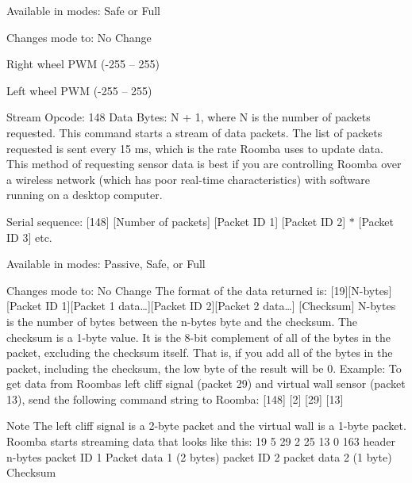 \begin{Desc}
\begin{description}
\begin{DoxyItemize}
\item Available in modes\+: Safe or Full
\item Changes mode to\+: No Change
\item Right wheel P\+W\+M (-\/255 – 255)
\item Left wheel P\+W\+M (-\/255 – 255) 
\end{DoxyItemize}\item[{\em 
\hypertarget{group__roomba-lib_gga305e17dfb7050ad83ea49ded2e6a2e24ad81a1446d5956b6717c8a28ec74c2bf9}{}R\+O\+O\+M\+B\+A\+\_\+\+S\+T\+R\+E\+A\+M\label{group__roomba-lib_gga305e17dfb7050ad83ea49ded2e6a2e24ad81a1446d5956b6717c8a28ec74c2bf9}
}]Stream Opcode\+: 148 Data Bytes\+: N + 1, where N is the number of packets requested. This command starts a stream of data packets. The list of packets requested is sent every 15 ms, which is the rate Roomba uses to update data. This method of requesting sensor data is best if you are controlling Roomba over a wireless network (which has poor real-\/time characteristics) with software running on a desktop computer.
\begin{DoxyItemize}
\item Serial sequence\+: \mbox{[}148\mbox{]} \mbox{[}Number of packets\mbox{]} \mbox{[}Packet I\+D 1\mbox{]} \mbox{[}Packet I\+D 2\mbox{]} $\ast$ \mbox{[}Packet I\+D 3\mbox{]} etc.
\item Available in modes\+: Passive, Safe, or Full
\item Changes mode to\+: No Change The format of the data returned is\+: \mbox{[}19\mbox{]}\mbox{[}N-\/bytes\mbox{]}\mbox{[}Packet I\+D 1\mbox{]}\mbox{[}Packet 1 data…\mbox{]}\mbox{[}Packet I\+D 2\mbox{]}\mbox{[}Packet 2 data…\mbox{]} \mbox{[}Checksum\mbox{]} N-\/bytes is the number of bytes between the n-\/bytes byte and the checksum. The checksum is a 1-\/byte value. It is the 8-\/bit complement of all of the bytes in the packet, excluding the checksum itself. That is, if you add all of the bytes in the packet, including the checksum, the low byte of the result will be 0. Example\+: To get data from Roomba\textquotesingle{}s left cliff signal (packet 29) and virtual wall sensor (packet 13), send the following command string to Roomba\+: \mbox{[}148\mbox{]} \mbox{[}2\mbox{]} \mbox{[}29\mbox{]} \mbox{[}13\mbox{]} \begin{DoxyNote}{Note}
The left cliff signal is a 2-\/byte packet and the virtual wall is a 1-\/byte packet. Roomba starts streaming data that looks like this\+: 19 5 29 2 25 13 0 163 header n-\/bytes packet I\+D 1 Packet data 1 (2 bytes) packet I\+D 2 packet data 2 (1 byte) Checksum 


\end{DoxyNote}
\end{DoxyItemize}
\end{description}
\end{Desc}
